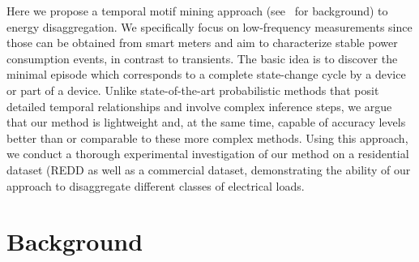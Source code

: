 Here we propose a temporal motif mining approach (see~\cite{motif1,motif2}
for background)
to energy disaggregation. We specifically focus on low-frequency measurements
since those can be obtained from smart meters
and aim to characterize stable power consumption events, in contrast
to transients. The basic idea is to
discover the minimal episode which corresponds to a
complete state-change cycle
by a device or part of a device.
Unlike state-of-the-art probabilistic methods that
posit detailed temporal relationships and
involve complex inference steps, we argue that our method
is lightweight and, at the same time, capable of accuracy levels
better than or comparable to
these more complex methods.
Using this approach,
we conduct a thorough experimental investigation of our method on
a residential dataset (REDD \cite{kolter2010redd} as well as a
commercial dataset,
demonstrating the ability of our approach to
disaggregate different classes of electrical loads.

%
\section{Background}
